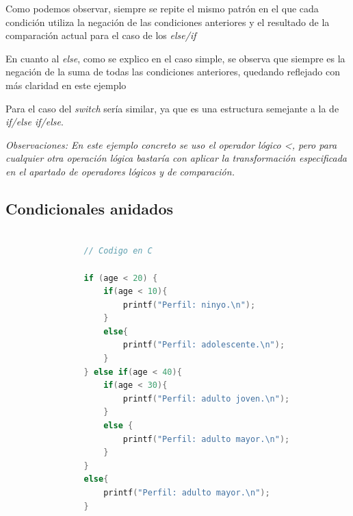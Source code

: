 \documentclass[a4paper,10pt]{article}
\begin{document}
			\noindent Como podemos observar, siempre se repite el mismo patrón en el que cada condición utiliza la negación de las condiciones anteriores y el resultado de la comparación actual para el caso de los \textit{else/if}
			
			\vspace{0.2cm}
			
			\noindent En cuanto al \textit{else}, como se explico en el caso simple, se observa que siempre es la negación de la suma de todas las condiciones anteriores, quedando reflejado con más claridad en este ejemplo 
			
			\vspace{0.2cm}
			
			\noindent Para el caso del \textit{switch} sería similar, ya que es una estructura semejante a la de  \textit{if/else if/else}.
			
			\vspace{0.3cm}
				
			\noindent \textit{Observaciones: En este ejemplo concreto se uso el operador lógico <, pero para cualquier otra operación lógica bastaría con aplicar la transformación especificada en el apartado de operadores lógicos y de comparación.} 
		
		
		\subsection*{Condicionales anidados}
				\begin{lstlisting}[language=C]
				
				// Codigo en C
				
				if (age < 20) {
					if(age < 10){
						printf("Perfil: ninyo.\n");
					}
					else{
						printf("Perfil: adolescente.\n");
					}
				} else if(age < 40){
					if(age < 30){
						printf("Perfil: adulto joven.\n");
					}
					else {
						printf("Perfil: adulto mayor.\n");
					}
				}
				else{
					printf("Perfil: adulto mayor.\n");
				}
			\end{lstlisting}
			
\end{document}
